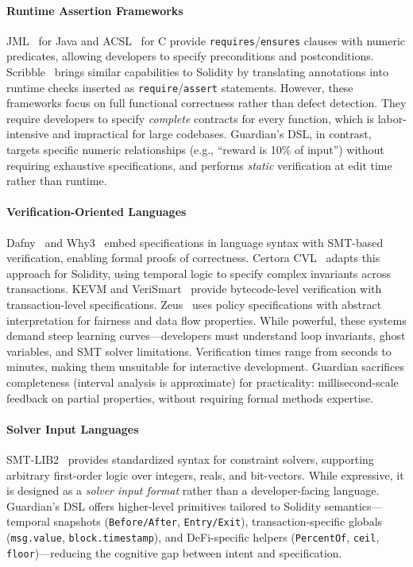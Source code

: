 \documentclass[pdflatex,sn-basic]{sn-jnl}%
\theoremstyle{thmstyleone}%
\theoremstyle{thmstyletwo}%
\theoremstyle{thmstylethree}%
\begin{document}
\paragraph{Runtime Assertion Frameworks}
JML~\citep{jml} for Java and ACSL~\citep{acsl} for C provide \texttt{requires}/\texttt{ensures} clauses with numeric predicates, allowing developers to specify preconditions and postconditions. Scribble~\citep{scribble} brings similar capabilities to Solidity by translating annotations into runtime checks inserted as \texttt{require}/\texttt{assert} statements. However, these frameworks focus on full functional correctness rather than defect detection. They require developers to specify \textit{complete} contracts for every function, which is labor-intensive and impractical for large codebases. Guardian's DSL, in contrast, targets specific numeric relationships (e.g., ``reward is 10\% of input'') without requiring exhaustive specifications, and performs \textit{static} verification at edit time rather than runtime.

\paragraph{Verification-Oriented Languages}
Dafny~\citep{dafny} and Why3~\citep{why3} embed specifications in language syntax with SMT-based verification, enabling formal proofs of correctness. Certora CVL~\citep{certora} adapts this approach for Solidity, using temporal logic to specify complex invariants across transactions. KEVM and VeriSmart~\citep{verismart} provide bytecode-level verification with transaction-level specifications. Zeus~\citep{zeus} uses policy specifications with abstract interpretation for fairness and data flow properties. While powerful, these systems demand steep learning curves—developers must understand loop invariants, ghost variables, and SMT solver limitations. Verification times range from seconds to minutes, making them unsuitable for interactive development. Guardian sacrifices completeness (interval analysis is approximate) for practicality: millisecond-scale feedback on partial properties, without requiring formal methods expertise.

\paragraph{Solver Input Languages}
SMT-LIB2~\citep{smtlib} provides standardized syntax for constraint solvers, supporting arbitrary first-order logic over integers, reals, and bit-vectors. While expressive, it is designed as a \textit{solver input format} rather than a developer-facing language. Guardian's DSL offers higher-level primitives tailored to Solidity semantics—temporal snapshots (\texttt{Before/After}, \texttt{Entry/Exit}), transaction-specific globals (\texttt{msg.value}, \texttt{block.timestamp}), and DeFi-specific helpers (\texttt{PercentOf}, \texttt{ceil}, \texttt{floor})—reducing the cognitive gap between intent and specification.
\end{document}

